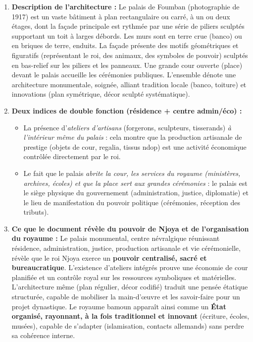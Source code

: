 \documentclass[11pt]{article}
\begin{document}
\begin{corrige}
\begin{enumerate}
\item \textbf{Description de l'architecture :} Le palais de Foumban (photographie de 1917) est un vaste bâtiment à plan rectangulaire ou carré, à un ou deux étages, dont la façade principale est rythmée par une série de piliers sculptés supportant un toit à larges débords. Les murs sont en terre crue (banco) ou en briques de terre, enduits. La façade présente des motifs géométriques et figuratifs (représentant le roi, des animaux, des symboles de pouvoir) sculptés en bas-relief sur les piliers et les panneaux. Une grande cour ouverte (place) devant le palais accueille les cérémonies publiques. L'ensemble dénote une architecture monumentale, soignée, alliant tradition locale (banco, toiture) et innovations (plan symétrique, décor sculpté systématique).

\item \textbf{Deux indices de double fonction (résidence + centre admin/éco) :}
\begin{itemize}
\item La présence d'\emph{ateliers d'artisans} (forgerons, sculpteurs, tisserands) \emph{à l'intérieur même du palais} : cela montre que la production artisanale de prestige (objets de cour, regalia, tissus ndop) est une activité économique contrôlée directement par le roi.
\item Le fait que le palais \emph{abrite la cour, les services du royaume (ministères, archives, écoles) et que la place sert aux grandes cérémonies} : le palais est le siège physique du gouvernement (administration, justice, diplomatie) et le lieu de manifestation du pouvoir politique (cérémonies, réception des tributs).
\end{itemize}

\item \textbf{Ce que le document révèle du pouvoir de Njoya et de l'organisation du royaume :}
Le palais monumental, centre névralgique réunissant résidence, administration, justice, production artisanale et vie cérémonielle, révèle que le roi Njoya exerce un \textbf{pouvoir centralisé, sacré et bureaucratique}. L'existence d'ateliers intégrés prouve une économie de cour planifiée et un contrôle royal sur les ressources symboliques et matérielles. L'architecture même (plan régulier, décor codifié) traduit une pensée étatique structurée, capable de mobiliser la main-d'œuvre et les savoir-faire pour un projet dynastique. Le royaume bamoun apparaît ainsi comme un \textbf{État organisé, rayonnant, à la fois traditionnel et innovant} (écriture, écoles, musées), capable de s'adapter (islamisation, contacts allemands) sans perdre sa cohérence interne.
\end{enumerate}
\end{corrige}
\end{document}

